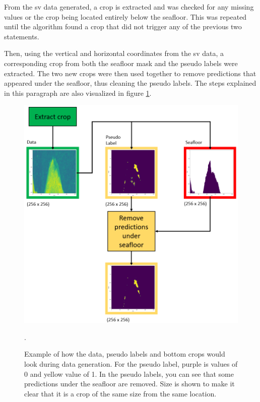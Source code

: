         From the \gls{sv} data generated, a crop is extracted and was checked for any missing values or the crop being located entirely below the seafloor. This was repeated until the algorithm found a crop that did not trigger any of the previous two statements.
        
        Then, using the vertical and horizontal coordinates from the \gls{sv} data, a corresponding crop from both the seafloor mask and the pseudo labels were extracted. The two new crops were then used together to remove predictions that appeared under the seafloor, thus cleaning the pseudo labels. The steps explained in this paragraph are also visualized in figure \ref{crop_extract_fig}.
        \clearpage
        \begin{figure}[H]
            \centering
            \includegraphics[scale=0.5]{figures/crop_extract_illustration.png}
            \caption[Data, label and bottom crop extraction and interaction]{Example of how the data, pseudo labels and bottom crops would look during data generation. For the pseudo label, purple is values of 0 and yellow value of 1. In the pseudo labels, you can see that some predictions under the seafloor are removed.  Size is shown to make it clear that it is a crop of the same size from the same location.}.
          	\medskip 
            \label{crop_extract_fig}
        \end{figure}
        
